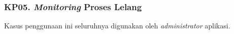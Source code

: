 \subsubsection{KP05. \textit{Monitoring} Proses Lelang}
\label{kp05}
Kasus penggunaan ini seluruhnya digunakan oleh \textit{administrator} aplikasi.






